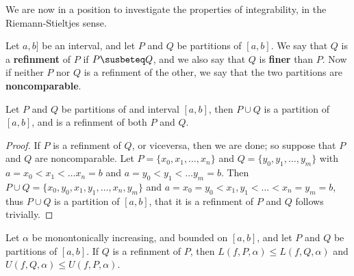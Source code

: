 We are now in a position to investigate the properties of integrability, in the
Riemann-Stieltjes sense.

\begin{definition}
    Let $a,b]$ be an interval, and let  $P$ and  $Q$ be partitions of  $[a,b]$.
    We say that  $Q$ is a \textbf{refinment} of $P$ if  $P \susbeteq Q$, and we
    also say that $Q$ is \textbf{finer} than  $P$. Now if neither  $P$ nor  $Q$
    is a refinment of the other, we say that the two partitions are
    \textbf{noncomparable}.
\end{definition}

\begin{lemma}\label{7.1.2}
    Let $P$ and  $Q$ be partitions of and interval $[a,b]$, then  $P \cup Q$ is
    a partition of  $[a,b]$, and is a refinment of both  $P$ and  $Q$.
\end{lemma}
\begin{proof}
    If $P$ is a refinment of  $Q$, or viceversa, then we are done; so suppose
    that  $P$ and  $Q$ are noncomparable. Let  $P=\{x_0,x_1, \dots, x_n\}$ and
    $Q=\{y_0,y_1, \dots, y_m\}$ with $a=x_0<x_1< \dots x_n=b$ and $a=y_0<y_1<
    \dots y_m=b$. Then $P \cup Q=\{x_0,y_0,x_1,y_1, \dots, x_n,y_m\}$ and
    $a=x_0=y_0 < x_1,y_1 < \dots <x_n=y_m=b$, thus $P \cup Q$ is a partition of
    $[a,b]$, that it is a refinment of  $P$ and  $Q$ follows trivially.
\end{proof}

\begin{theorem}\label{7.1.3}
    Let $\alpha$ be monontonically increasing, and bounded on  $[a,b]$, and let
    $P$ and  $Q$ be partitions of  $[a,b]$. If  $Q$ is a refinment of  $P$, then
    $L(f,P,\alpha) \leq L(f,Q,\alpha)$ and  $U(f,Q,\alpha) \leq U(f,P,\alpha)$.
\end{theorem}

